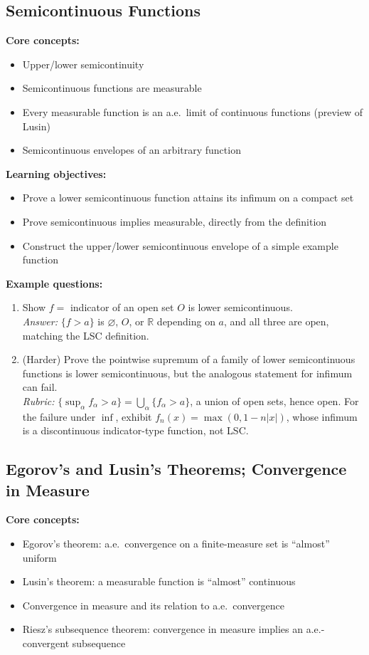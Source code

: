\documentclass[11pt]{article}
\begin{document}
\subsection{Semicontinuous Functions}

\textbf{Core concepts:}
\begin{itemize}[nosep]
\item Upper/lower semicontinuity
\item Semicontinuous functions are measurable
\item Every measurable function is an a.e.\ limit of continuous functions (preview of Lusin)
\item Semicontinuous envelopes of an arbitrary function
\end{itemize}

\textbf{Learning objectives:}
\begin{itemize}[nosep]
\item Prove a lower semicontinuous function attains its infimum on a compact set
\item Prove semicontinuous implies measurable, directly from the definition
\item Construct the upper/lower semicontinuous envelope of a simple example function
\end{itemize}

\textbf{Example questions:}
\begin{enumerate}[nosep]
\item Show $f=$ indicator of an open set $O$ is lower semicontinuous. \\
\textit{Answer:} $\{f>a\}$ is $\varnothing$, $O$, or $\mathbb{R}$ depending on $a$, and all three are open, matching the LSC definition.
\item (Harder) Prove the pointwise supremum of a family of lower semicontinuous functions is lower semicontinuous, but the analogous statement for infimum can fail. \\
\textit{Rubric:} $\{\sup_\alpha f_\alpha>a\}=\bigcup_\alpha\{f_\alpha>a\}$, a union of open sets, hence open. For the failure under $\inf$, exhibit $f_n(x)=\max(0,1-n|x|)$, whose infimum is a discontinuous indicator-type function, not LSC.
\end{enumerate}

\subsection{Egorov's and Lusin's Theorems; Convergence in Measure}

\textbf{Core concepts:}
\begin{itemize}[nosep]
\item Egorov's theorem: a.e.\ convergence on a finite-measure set is ``almost'' uniform
\item Lusin's theorem: a measurable function is ``almost'' continuous
\item Convergence in measure and its relation to a.e.\ convergence
\item Riesz's subsequence theorem: convergence in measure implies an a.e.-convergent subsequence
\end{itemize}
\end{document}
